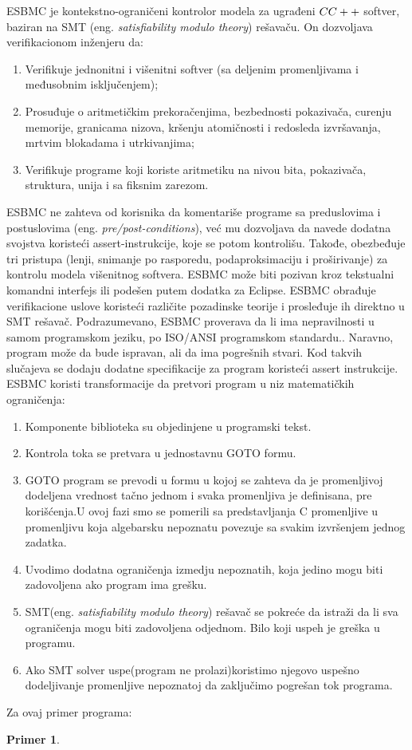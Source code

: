 \documentclass[a4paper]{article}
\newtheorem{primer}{Primer}[section]
\begin{document}
{ESBMC je kontekstno-ograničeni kontrolor modela za ugrađeni $C\/C++$ softver, baziran na SMT (eng. \emph{satisfiability modulo theory}) rešavaču.  On dozvoljava verifikacionom inženjeru da: 
	\newline
	\begin{enumerate}
	\item Verifikuje jednonitni i višenitni softver (sa deljenim promenljivama i međusobnim isključenjem);
	\item Prosuđuje o aritmetičkim prekoračenjima, bezbednosti pokazivača, curenju memorije, granicama nizova, kršenju atomičnosti i redosleda izvršavanja, mrtvim blokadama i utrkivanjima; 
	\item Verifikuje programe koji koriste aritmetiku na nivou bita, pokazivača, struktura, unija i sa fiksnim zarezom.
	\end{enumerate} 
	ESBMC ne zahteva od korisnika da komentariše programe sa preduslovima i postuslovima (eng. \emph{pre/post-conditions}), već mu dozvoljava da navede dodatna svojstva koristeći assert-instrukcije, koje se potom kontrolišu. Takođe, obezbeđuje tri pristupa (lenji, snimanje po rasporedu, podaproksimaciju i proširivanje) za kontrolu modela višenitnog softvera. ESBMC može biti pozivan kroz tekstualni komandni interfejs ili podešen putem dodatka za Eclipse. ESBMC obrađuje verifikacione uslove koristeći različite pozadinske teorije i prosleđuje ih direktno u SMT rešavač. \cite{esbmc}
	\newline
	Podrazumevano, ESBMC proverava da li ima nepravilnosti u samom programskom jeziku, po ISO/ANSI programskom standardu.. Naravno, program može da bude ispravan, ali da ima pogrešnih stvari. Kod takvih slučajeva se dodaju dodatne specifikacije za program koristeći assert instrukcije. 
	\newline
	ESBMC  koristi transformacije  da pretvori program u niz matematičkih ograničenja:
	\begin{enumerate}
	\item Komponente biblioteka su objedinjene u programski tekst.
	\item Kontrola toka se pretvara u jednostavnu GOTO formu.
	\item GOTO program se prevodi u formu  u kojoj se zahteva da je promenljivoj dodeljena vrednost tačno jednom i svaka promenljiva je definisana, pre korišćenja.U ovoj fazi smo se pomerili sa predstavljanja C promenljive u promenljivu koja algebarsku nepoznatu povezuje sa svakim izvršenjem jednog zadatka.
	\item Uvodimo dodatna ograničenja izmedju nepoznatih, koja jedino mogu biti zadovoljena ako program ima grešku.
	\item SMT(eng. \emph{satisfiability modulo theory}) rešavač se pokreće da istraži da li sva ograničenja mogu biti zadovoljena odjednom. Bilo koji uspeh je greška u programu.
	\item Ako SMT solver uspe(program ne prolazi)koristimo njegovo uspešno dodeljivanje promenljive nepoznatoj da zaključimo pogrešan tok programa.
	\end{enumerate}
	Za ovaj primer programa:
	\newline
	\begin{primer}


\end{primer}}
\end{document}

